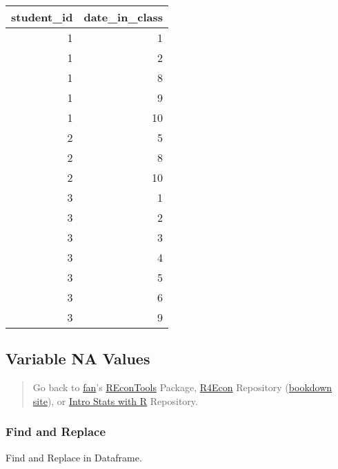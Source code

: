\documentclass[
]{book}
\begin{document}
\begin{table}[!h]
\centering
\begin{tabular}{r|r}
\hline
student\_id & date\_in\_class\\
\hline
\rowcolor{gray!6}  1 & 1\\
\hline
1 & 2\\
\hline
\rowcolor{gray!6}  1 & 8\\
\hline
1 & 9\\
\hline
\rowcolor{gray!6}  1 & 10\\
\hline
2 & 5\\
\hline
\rowcolor{gray!6}  2 & 8\\
\hline
2 & 10\\
\hline
\rowcolor{gray!6}  3 & 1\\
\hline
3 & 2\\
\hline
\rowcolor{gray!6}  3 & 3\\
\hline
3 & 4\\
\hline
\rowcolor{gray!6}  3 & 5\\
\hline
3 & 6\\
\hline
\rowcolor{gray!6}  3 & 9\\
\hline
\end{tabular}
\end{table}

\hypertarget{variable-na-values}{%
\subsection{Variable NA Values}\label{variable-na-values}}

\begin{quote}
Go back to \href{http://fanwangecon.github.io/CodeDynaAsset/}{fan}'s \href{https://fanwangecon.github.io/REconTools/}{REconTools} Package, \href{https://fanwangecon.github.io/R4Econ/}{R4Econ} Repository (\href{https://fanwangecon.github.io/R4Econ/bookdown}{bookdown site}), or \href{https://fanwangecon.github.io/Stat4Econ/}{Intro Stats with R} Repository.
\end{quote}

\hypertarget{find-and-replace}{%
\subsubsection{Find and Replace}\label{find-and-replace}}

Find and Replace in Dataframe.
\end{document}
